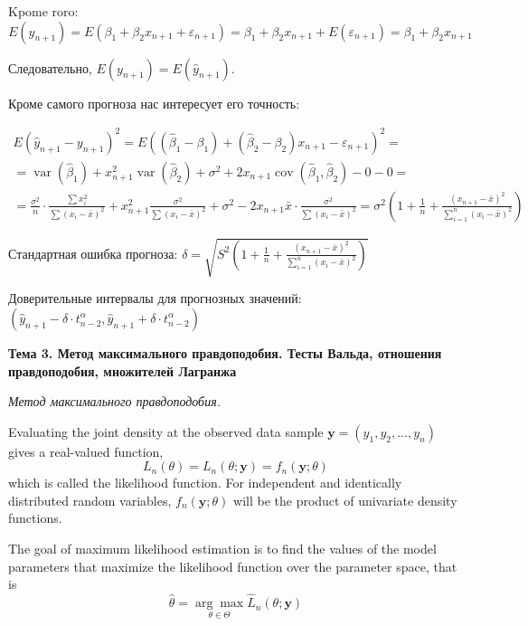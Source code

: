 \documentclass[a4paper,8pt]{article} %
\begin{document}
Kpome roro:
$E\left(y_{n+1}\right)=E\left(\beta_{1}+\beta_{2} x_{n+1}+\varepsilon_{n+1}\right)=\beta_{1}+\beta_{2} x_{n+1}+E\left(\varepsilon_{n+1}\right)=\beta_{1}+\beta_{2} x_{n+1}$

Следовательно, $E\left(y_{n+1}\right)=E\left(\hat{y}_{n+1}\right) .$

Кроме самого прогноза нас интересует его точность:

$$
\begin{array}{c}
E\left(\hat{y}_{n+1}-y_{n+1}\right)^{2}=E\left(\left(\hat{\beta}_{1}-\beta_{1}\right)+\left(\hat{\beta}_{2}-\beta_{2}\right) x_{n+1}-\varepsilon_{n+1}\right)^{2}= \\
=\operatorname{var}\left(\hat{\beta}_{1}\right)+x_{n+1}^{2} \operatorname{var}\left(\hat{\beta}_{2}\right)+\sigma^{2}+2 x_{n+1} \operatorname{cov}\left(\hat{\beta}_{1}, \hat{\beta}_{2}\right)-0-0= \\
=\frac{\sigma^{2}}{n} \cdot \frac{\sum x_{i}^{2}}{\sum\left(x_{i}-\bar{x}\right)^{2}}+x_{n+1}^{2} \frac{\sigma^{2}}{\sum\left(x_{i}-\bar{x}\right)^{2}}+\sigma^{2}-2 x_{n+1} \bar{x} \cdot \frac{\sigma^{2}}{\sum\left(x_{i}-\bar{x}\right)^{2}}
=\sigma^{2}\left(1+\frac{1}{n}+\frac{\left(x_{n+1}-\bar{x}\right)^{2}}{\sum_{i=1}^{n}\left(x_{i}-\bar{x}\right)^{2}}\right)
\end{array}
$$

Стандартная ошибка прогноза:
$\delta=\sqrt{S^{2}\left(1+\frac{1}{n}+\frac{\left(x_{n+1}-\bar{x}\right)^{2}}{\sum_{i=1}^{n}\left(x_{i}-\bar{x}\right)^{2}}\right)}$

Доверительные  интервалы для прогнозных значений: $\left(\hat{y}_{n+1}-\delta \cdot t_{n-2}^{\alpha}, \hat{y}_{n+1}+\delta \cdot t_{n-2}^{\alpha}\right)$


\textbf{Тема 3. Метод максимального правдоподобия. Тесты Вальда, отношения правдоподобия, множителей Лагранжа}

\textit{Метод  максимального  правдоподобия.  }

Evaluating the joint density at the observed data sample $\mathbf{y}=\left(y_{1}, y_{2}, \ldots, y_{n}\right)$ gives a real-valued function,
$$
L_{n}(\theta)=L_{n}(\theta ; \mathbf{y})=f_{n}(\mathbf{y} ; \theta)
$$
which is called the likelihood function. For independent and identically distributed random variables, $f_{n}(\mathbf{y} ; \theta)$ will be the product of univariate density functions.

The goal of maximum likelihood estimation is to find the values of the model parameters that maximize the likelihood function over the parameter space,  that is
$$
\hat{\theta}=\underset{\theta \in \Theta}{\arg \max } \widehat{L}_{n}(\theta ; \mathbf{y})
$$
\end{document}
